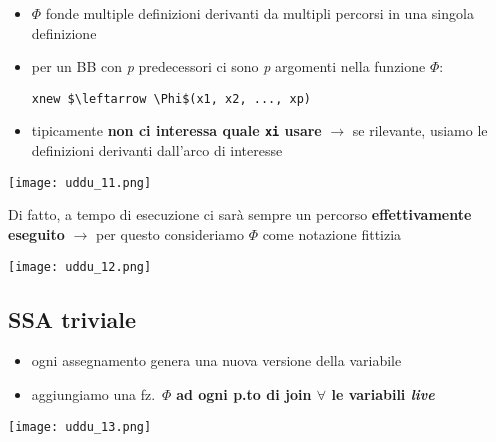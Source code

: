 \noindent\begin{minipage}[c]{.65\textwidth}
  \begin{itemize}
    \item $\Phi$ fonde multiple definizioni derivanti da multipli percorsi in una singola definizione
    \item per un BB con \textit{p} predecessori ci sono \textit{p} argomenti nella funzione $\Phi$:
      \begin{lstlisting}
xnew $\leftarrow \Phi$(x1, x2, ..., xp)\end{lstlisting}
    \item tipicamente \textbf{non ci interessa quale \lstinline|xi| usare} $\rightarrow$ se rilevante, usiamo le definizioni derivanti dall'arco di interesse
  \end{itemize}
\end{minipage}\hfill
\begin{minipage}[c]{.3\textwidth}
  \texttt{[image: uddu\_11.png]}
\end{minipage}

\begin{example}[frametitle={Come si implementa $\Phi$}]
  \noindent \begin{minipage}[c]{.5\textwidth}
    Di fatto, a tempo di esecuzione ci sar\`a sempre un percorso \textbf{effettivamente eseguito} $\rightarrow$ per questo consideriamo $\Phi$ come notazione fittizia
  \end{minipage}\hfill
  \begin{minipage}[c]{.25\textwidth}
    \texttt{[image: uddu\_12.png]}
  \end{minipage}
\end{example}

\subsection{SSA triviale}

\noindent \begin{minipage}[c]{.4\textwidth}
  \begin{itemize}
    \item ogni assegnamento genera una nuova versione della variabile
    \item aggiungiamo una fz.~$\Phi$ \textbf{ad ogni p.to di join $\forall$ le variabili \textit{live}}  
  \end{itemize}
\end{minipage}\hfill
\begin{minipage}[c]{.55\textwidth}
  \centering
  \texttt{[image: uddu\_13.png]}
\end{minipage}

